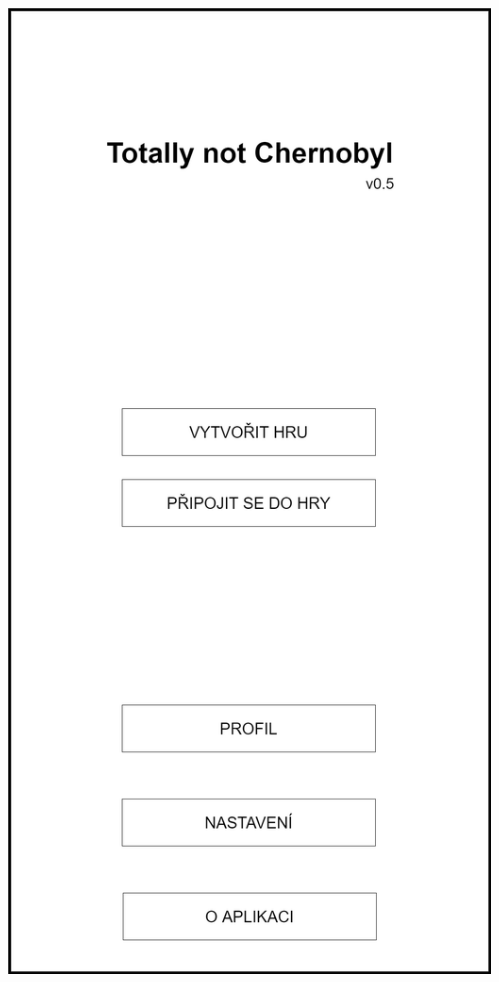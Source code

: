 \documentclass[czech,aspectratio=169]{beamer}
\begin{document}
\begin{frame}
\begin{columns}
\begin{column}{.25\textwidth}
        \begin{center}
          \includegraphics[width=.9\textwidth]{slides/screen-1}
        \end{center}
      \end{column}
      \begin{column}{.25\textwidth}
        \begin{center}

\end{center}
\end{column}
\end{columns}
\end{frame}
\end{document}
